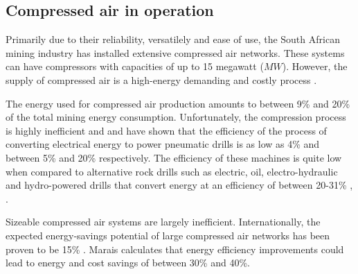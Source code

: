 	\subsection{Compressed air in operation}\label{key}
		Primarily due to their reliability, versatilely and ease of use, the South African mining industry has installed extensive compressed air networks. These systems can have compressors with capacities of up to 15 megawatt ($MW$)\cite{Marais2012PhD}. However, the supply of compressed air is a high-energy demanding and costly process \cite{padachi2009energy}.
		\par 
		The energy used for compressed air production amounts to between 9\% and 20\% of the total mining energy consumption\footnotemark[1] \cite{du2011development}.  Unfortunately, the compression process is highly inefficient and \cite{fraser2008saving} and \cite{yang2009air} have shown that the efficiency of the process of converting electrical energy to power pneumatic drills is as low as 4\% and between 5\% and 20\%  respectively. The efficiency of these machines is quite low when compared to alternative rock drills such as electric, oil, electro-hydraulic and hydro-powered drills that convert energy at an efficiency of between 20-31\% \cite{fraser2008saving}, \cite{vanTonder2010Masters}. 
		\par
		\clearpage
		Sizeable compressed air systems are largely inefficient. Internationally, the expected energy-savings potential of large compressed air networks has been proven to be 15\% \cite{neale2009compressed}. Marais \cite{marais2013simplification} calculates that energy efficiency improvements could lead to energy and cost savings of between 30\% and 40\%. 
		
